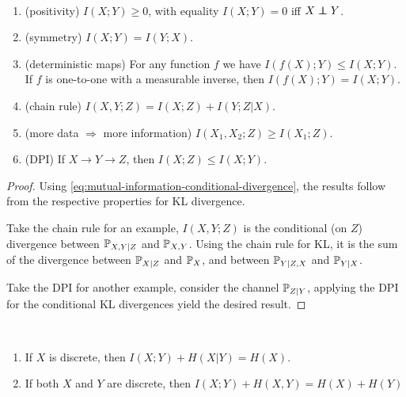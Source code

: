 \begin{theorem}
    \
    \begin{enumerate}[label=(\roman*)]
        \item (positivity) $I(X;Y)\geq 0$, with equality $I(X;Y)=0$ iff $X\perp\!\!\!\!\perp Y$.
        \item (symmetry) $I(X;Y)=I(Y;X)$.
        \item (deterministic maps) For any function $f$ we have $I(f(X);Y)\leq I(X;Y)$.
        If $f$ is one-to-one with a measurable inverse, then $I(f(X);Y)=I(X;Y)$.
        \item (chain rule) $I(X,Y;Z)=I(X;Z)+I(Y;Z|X).$
        \item (more data $\Longrightarrow$ more information) $I(X_1,X_2;Z)\geq I(X_1;Z)$.
        \item (DPI) If $X\to Y\to Z$, then $I(X;Z)\leq I(X;Y)$.
    \end{enumerate}
\end{theorem}
\begin{proof}
    Using \eqref{eq:mutual-information-conditional-divergence}, the results follow from the respective properties for KL divergence.
    
    Take the chain rule for an example, $I(X,Y;Z)$ is the conditional (on $Z$) divergence between $\mathbb{P}_{X,Y|Z}$ and $\mathbb{P}_{X,Y}$.
    Using the chain rule for KL, it is the sum of the divergence between $\mathbb{P}_{X|Z}$ and $\mathbb{P}_X$, and between $\mathbb{P}_{Y|Z,X}$ and $\mathbb{P}_{Y|X}$.

    Take the DPI for another example, consider the channel $\mathbb{P}_{Z|Y}$, applying the DPI for the conditional KL divergences yield the desired result.
\end{proof}

\begin{theorem}
    \
    \begin{enumerate}[label=(\roman*)]
        \item If $X$ is discrete, then $I(X;Y)+H(X|Y)=H(X)$.
        \item If both $X$ and $Y$ are discrete, then $I(X;Y)+H(X,Y)=H(X)+H(Y)$
    \end{enumerate}
\end{theorem}



